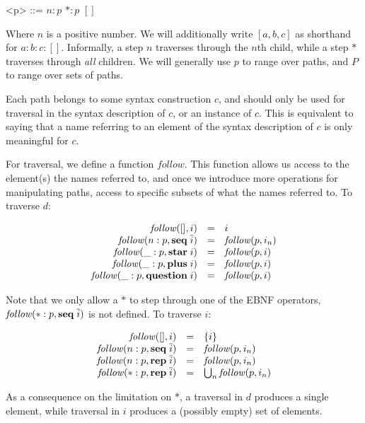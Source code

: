 \documentclass{kththesis}
\newcommand{\ssynt}[1]{\ensuremath{\mathit{#1}}}
\newenvironment{sgrammar}{\begin{grammar}\renewcommand{\grammarlabel}[2]{\ssynt{##1} \hfill##2}}{\end{grammar}}
\begin{document}
\setlength{\grammarindent}{3em}
\begin{sgrammar}
<p> ::= $n : p$
\alt $* : p$
\alt $[]$
\end{sgrammar}

Where $n$ is a positive number. We will additionally write $[a, b, c]$ as shorthand for $a : b : c : []$. Informally, a step $n$ traverses through the $n$th child, while a step $*$ traverses through \emph{all} children. We will generally use $p$ to range over paths, and $P$ to range over sets of paths.

Each path belongs to some syntax construction $c$, and should only be used for traversal in the syntax description of $c$, or an instance of $c$. This is equivalent to saying that a name referring to an element of the syntax description of $c$ is only meaningful for $c$.

\newcommand{\follow}{\mathit{follow}}

For traversal, we define a function $\follow$. This function allows us access to the element(s) the names referred to, and once we introduce more operations for manipulating paths, access to specific subsets of what the names referred to. To traverse \ssynt{d}:

$$
\begin{array}{rcl}
\follow([], i) &=& i \\
\follow(n : p, \seq \overline{i}) &=& \follow(p, i_n) \\
\follow(\_ : p, \repstar i) &=& \follow(p, i) \\
\follow(\_ : p, \repplus i) &=& \follow(p, i) \\
\follow(\_ : p, \repquestion i) &=& \follow(p, i) \\
\end{array}
$$

Note that we only allow a $*$ to step through one of the EBNF operators, $\follow(* : p, \seq \overline{i})$ is not defined. To traverse \ssynt{i}:

$$
\begin{array}{rcl}
\follow([], i) &=& \{i\} \\
\follow(n : p, \seq \overline{i}) &=& \follow(p, i_n) \\
\follow(n : p, \repseq \overline{i}) &=& \follow(p, i_n) \\
\follow(* : p, \repseq \overline{i}) &=& \bigcup_n \follow(p, i_n) \\
\end{array}
$$

As a consequence on the limitation on $*$, a traversal in \ssynt{d} produces a single element, while traversal in \ssynt{i} produces a (possibly empty) set of elements.
\end{document}
